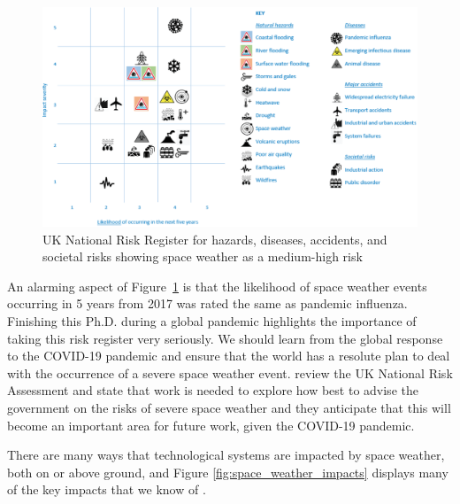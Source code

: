 \begin{figure}[ht!]
	\centering
	\includegraphics[width=\columnwidth]{UK_risk_register.eps}
	\caption{UK National Risk Register for hazards, diseases, accidents, and societal risks showing space weather as a medium-high risk \citep{cabinet_office_national_2017}}
	\label{fig:UK_Risk_reg}
\end{figure}

\vspace{1em}

An alarming aspect of Figure~\ref{fig:UK_Risk_reg} is that the likelihood of space weather events occurring in 5 years from 2017 was rated the same as pandemic influenza. Finishing this Ph.D. during a global pandemic highlights the importance of taking this risk register very seriously. We should learn from the global response to the COVID-19 pandemic and ensure that the world has a resolute plan to deal with the occurrence of a severe space weather event. \citet{hapgood_development_2021} review the UK National Risk Assessment and state that work is needed to explore how best to advise the government on the risks of severe space weather and they anticipate that this will become an important area for future work, given the COVID-19 pandemic.

There are many ways that technological systems are impacted by space weather, both on or above ground, and Figure \ref{fig:space_weather_impacts} displays many of the key impacts that we know of \citep{beggan_ground_2018}. 


